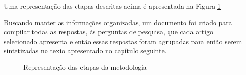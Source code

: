 Uma representação das etapas descritas acima é apresentada na Figura \ref{fig:funil_metodologia}

Buscando manter as informações organizadas, um documento foi criado para compilar todas as respostas, às perguntas de pesquisa, que cada artigo selecionado apresenta e então essas respostas foram agrupadas para então serem sintetizadas no texto apresentado no capítulo seguinte.

\begin{figure}[!htb]
    \centering
    
    \caption{Representação das etapas da metodologia}
    \label{fig:funil_metodologia}
\end{figure}